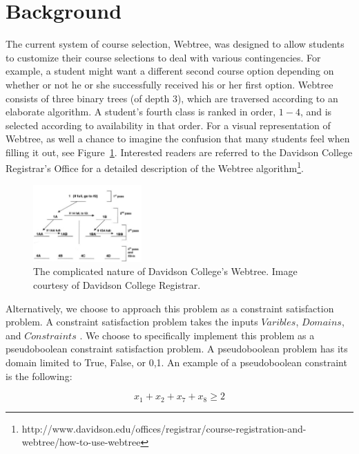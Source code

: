 
\section{Background}
\label{sec:background}

The current system of course selection, Webtree, was designed to allow
students to customize their course selections to deal with various
contingencies. For example, a student might want a different second
course option depending on whether or not he or she successfully
received his or her first option. Webtree consists of three binary
trees (of depth $3$), which are traversed according to an elaborate
algorithm. A student's fourth class is ranked in order, $1-4$, and is
selected according to availability in that order. For a visual
representation of Webtree, as well a chance to imagine the confusion that
many students feel when filling it out, see
Figure~\ref{fig:webtr}. Interested readers are referred to the
Davidson College Registrar's Office for a detailed description of the
Webtree algorithm\footnote{http://www.davidson.edu/offices/registrar/course-registration-and-webtree/how-to-use-webtree}.

\begin{figure}[htb]
  \centering  %
  \includegraphics[width=0.37\textwidth]{figs/webtree.jpg}
  \caption{The complicated nature of Davidson College's Webtree. Image
    courtesy of Davidson College Registrar.}
  \label{fig:webtr}
\end{figure}

Alternatively, we choose to approach this problem as a constraint
satisfaction problem. A constraint satisfaction problem takes the
inputs $Varibles$, $Domains$, and $Constraints$ \cite{aima}. We choose to
specifically implement this problem as a pseudoboolean constraint
satisfaction problem. A pseudoboolean problem has its domain limited
to {True, False}, or {0,1}. An example of a pseudoboolean constraint is the
following:

\begin{equation} x_1 + x_2 + x_7 + x_8 \geq 2 \end{equation}

